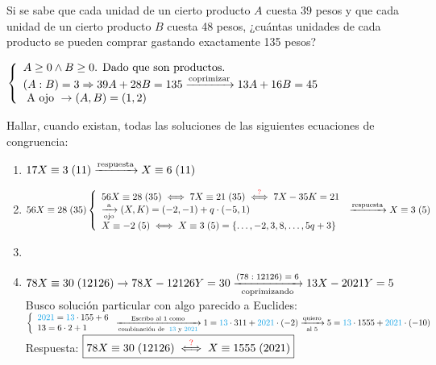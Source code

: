 \documentclass[12pt,a4paper, spanish]{article}
\begin{document}
\ejercicio
Si se sabe que cada unidad de un cierto producto $A$ cuesta $39$ pesos y que cada unidad de un cierto
producto $B$ cuesta 48 pesos, ¿cuántas unidades de cada producto se pueden comprar gastando exactamente
135 pesos?

\separadorCorto

$
	\llave{l}{
		A \geq 0 \y B \geq 0 \text{. Dado que son productos.}\\
		(A:B) = 3 \entonces 39A + 28B = 135
		\flecha{coprimizar}
		13A + 16B = 45\\
		\text{ A ojo } \to (A,B) = (1,2)
	}
$

\ejercicio
Hallar, cuando existan, todas las soluciones de las siguientes ecuaciones de congruencia:

\separadorCorto

\begin{enumerate}[label=\roman*)]
	\item $\congruencia{17X}{3}{11} \flecha{respuesta} \congruencia{X}{6}{11} $\\

	\item $\congruencia{56X}{28}{35}\\
		      \llave{l}{
			      \congruencia{56X}{28}{35} \sisolosi
			      \congruencia{7X}{21}{35} \stackrel{\red{?}}\sisolosi
			      7X - 35K = 21\\
			      \flecha{a}[ojo] (X,K) = (-2,-1) + q \cdot (-5, 1)\\
			      \congruencia{X}{-2}{5} \sisolosi \congruencia{X}{3}{5} = \set{\dots, -2, 3, 8, \dots, 5q+3}
		      }\\
		      \flecha{respuesta} \congruencia{X}{3}{5} $

	\item
	\item $\congruencia{78X}{30}{12126}  \to 78X - 12126 Y = 30 \flecha{$(78:12126) = 6$}[coprimizando] 13X - 2021 Y = 5$\\
	      Busco solución particular con algo parecido a Euclides:\\
	      $\llave{l}{
			      \blue{2021} =  \blue{13} \cdot 155 + 6\\
			      13 =  6 \cdot 2 + 1
		      }\flecha{Escribo al 1 como}[combinación de \blue{13} y\blue{2021}]
		      1 = \blue{13} \cdot 311 + \blue{2021} \cdot (-2)
		      \flecha{quiero}[al 5]
		      5 =  \blue{13}\cdot 1555 + \blue{2021} \cdot (-10)$\\

	      Respuesta: $\boxed{78X \equiv 30 \;(12126)
			      \stackrel{{\color{red}\text{?}}} {\iff} X \equiv 1555 \;(2021)}$

\end{enumerate}
\end{document}
